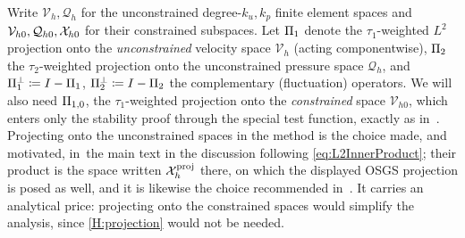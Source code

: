 Write $\mathcal{V}_h, \mathcal{Q}_h$ for the unconstrained degree{\hyp}$k_u,k_p$ finite element spaces and
$\mathcal{V}_{h0}, \mathcal{Q}_{h0}, \mathcal{X}_{h0}$ for their constrained subspaces. Let $\Pi_{1}$ denote the $\tau_1$-weighted $L^2$
projection onto the \emph{unconstrained} velocity space $\mathcal{V}_h$ (acting componentwise), $\Pi_{2}$ the
$\tau_2$-weighted projection onto the unconstrained pressure space $\mathcal{Q}_h$, and
$\Pi_{1}^{\perp} \coloneqq I - \Pi_{1}$, $\Pi_{2}^{\perp} \coloneqq I - \Pi_{2}$ the complementary
(fluctuation) operators. We will also need $\Pi_{1,0}$, the $\tau_1$-weighted projection
onto the \emph{constrained} space $\mathcal{V}_{h0}$, which enters only the stability proof
through the special test function, exactly as in~\cite{codina2008analysis}. Projecting onto the
unconstrained spaces in the method is the choice made, and motivated, in~the main text in
the discussion following \cref{eq:L2InnerProduct}; their product is the space written
$\mathcal{X}_{h}^{\mathrm{proj}}$ there, on which the displayed OSGS projection is posed as well, and it is likewise
the choice recommended in~\cite[Remark~1]{codina2008analysis}. It carries an analytical
price: projecting onto the constrained spaces would simplify the analysis, since
\cref{H:projection} would not be needed.

